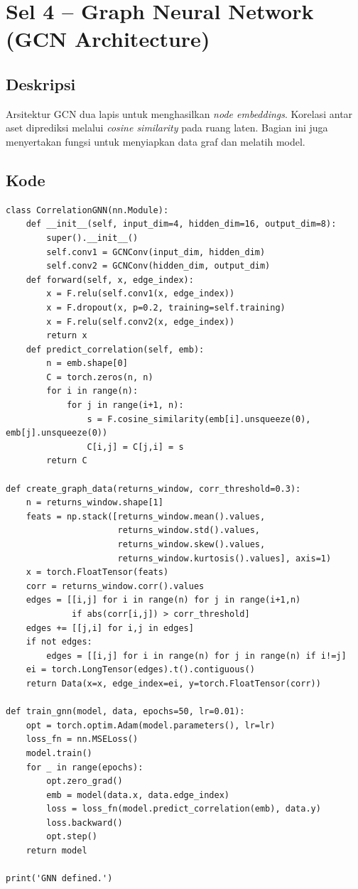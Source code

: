 \documentclass[12pt,a4paper]{article}
\begin{document}
\section{Sel 4 -- Graph Neural Network (GCN Architecture)}

\subsection{Deskripsi}
Arsitektur GCN dua lapis untuk menghasilkan \textit{node embeddings}. Korelasi 
antar aset diprediksi melalui \textit{cosine similarity} pada ruang laten. Bagian 
ini juga menyertakan fungsi untuk menyiapkan data graf dan melatih model.

\subsection{Kode}
\begin{lstlisting}[caption={Arsitektur CorrelationGNN dan pelatihan}]
class CorrelationGNN(nn.Module):
    def __init__(self, input_dim=4, hidden_dim=16, output_dim=8):
        super().__init__()
        self.conv1 = GCNConv(input_dim, hidden_dim)
        self.conv2 = GCNConv(hidden_dim, output_dim)
    def forward(self, x, edge_index):
        x = F.relu(self.conv1(x, edge_index))
        x = F.dropout(x, p=0.2, training=self.training)
        x = F.relu(self.conv2(x, edge_index))
        return x
    def predict_correlation(self, emb):
        n = emb.shape[0]
        C = torch.zeros(n, n)
        for i in range(n):
            for j in range(i+1, n):
                s = F.cosine_similarity(emb[i].unsqueeze(0), emb[j].unsqueeze(0))
                C[i,j] = C[j,i] = s
        return C

def create_graph_data(returns_window, corr_threshold=0.3):
    n = returns_window.shape[1]
    feats = np.stack([returns_window.mean().values,
                      returns_window.std().values,
                      returns_window.skew().values,
                      returns_window.kurtosis().values], axis=1)
    x = torch.FloatTensor(feats)
    corr = returns_window.corr().values
    edges = [[i,j] for i in range(n) for j in range(i+1,n)
             if abs(corr[i,j]) > corr_threshold]
    edges += [[j,i] for i,j in edges]
    if not edges:
        edges = [[i,j] for i in range(n) for j in range(n) if i!=j]
    ei = torch.LongTensor(edges).t().contiguous()
    return Data(x=x, edge_index=ei, y=torch.FloatTensor(corr))

def train_gnn(model, data, epochs=50, lr=0.01):
    opt = torch.optim.Adam(model.parameters(), lr=lr)
    loss_fn = nn.MSELoss()
    model.train()
    for _ in range(epochs):
        opt.zero_grad()
        emb = model(data.x, data.edge_index)
        loss = loss_fn(model.predict_correlation(emb), data.y)
        loss.backward()
        opt.step()
    return model

print('GNN defined.')
\end{lstlisting}
\end{document}
